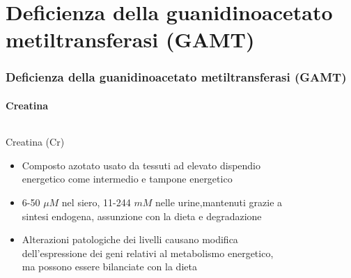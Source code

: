 \section{Deficienza della guanidinoacetato metiltransferasi (GAMT)}

\begin{frame}
\frametitle {Deficienza della guanidinoacetato metiltransferasi (GAMT)}
\framesubtitle {Creatina}
\begin{columns}
	\begin{block}{Creatina (Cr)}
		\begin{itemize}
			\item Composto azotato usato da tessuti ad elevato dispendio energetico come intermedio e tampone energetico
			\item 6-50 $\mu M$ nel siero, 11-244 $mM$ nelle urine,mantenuti grazie a \alert{sintesi endogena}, \alert{assunzione con la dieta} e \alert{degradazione}
			\item Alterazioni patologiche dei livelli causano modifica dell'espressione dei geni relativi al metabolismo energetico, ma possono essere bilanciate con la dieta
		\end{itemize}
	\end{block}

	\begin{figure}
	\end{figure}
\end{columns}





\end{frame}

